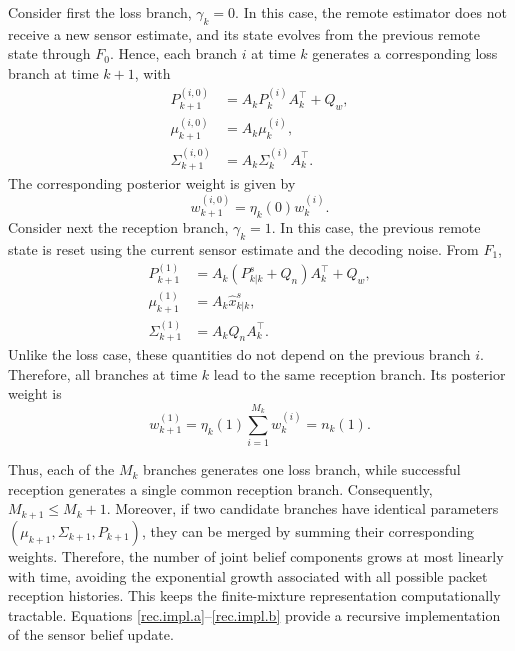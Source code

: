 \documentclass[letterpaper, 10 pt, conference]{ieeeconf}
\begin{document}
Consider first the loss branch, $\gamma_k=0$. In this case, the remote estimator does not receive a new sensor estimate, and its state evolves from the previous remote state through $F_0$. Hence, each branch $i$ at time $k$ generates a corresponding loss branch at time $k+1$, with
\begin{align}
    P^{(i,0)}_{k+1}&=A_kP_k^{(i)}A_k^\top+Q_w,\label{rec.impl.a}\\
    \mu_{k+1}^{(i,0)}&=A_k\mu_k^{(i)},\\
    \Sigma_{k+1}^{(i,0)} &= A_k\Sigma_k^{(i)}A_k^\top.
\end{align}
The corresponding posterior weight is given by
\begin{equation}
    w_{k+1}^{(i,0)} = \eta_k(0)w_k^{(i)}.
\end{equation}
Consider next the reception branch, $\gamma_k=1$. In this case, the previous remote state is reset using the current sensor estimate and the decoding noise. From $F_1$,
\begin{align}
    P_{k+1}^{(1)}&= A_k(P^s_{k|k}+Q_n)A_k^\top+Q_w,\\
    \mu_{k+1}^{(1)}&=A_k\hat{x}_{k|k}^s,\\
    \Sigma_{k+1}^{(1)}&=A_kQ_nA_k^\top.
\end{align}
Unlike the loss case, these quantities do not depend on the previous branch $i$. Therefore, all branches at time $k$ lead to the same reception branch. Its posterior weight is 
\begin{equation}
    w_{k+1}^{(1)}=\eta_k(1)\sum_{i=1}^{M_k}w_k^{(i)} = n_k(1).\label{rec.impl.b}
\end{equation}

Thus, each of the $M_k$ branches generates one loss branch, while successful reception generates a single common reception branch. Consequently, $M_{k+1}\leq M_k+1.$
Moreover, if two candidate branches have identical parameters $(\mu_{k+1},\Sigma_{k+1},P_{k+1})$, they can be merged by summing their corresponding weights. Therefore, the number of joint belief components grows at most linearly with time, avoiding the exponential growth associated with all possible packet reception histories. This keeps the finite-mixture representation computationally tractable. Equations \eqref{rec.impl.a}--\eqref{rec.impl.b} provide a recursive implementation of the sensor belief update.
\end{document}
